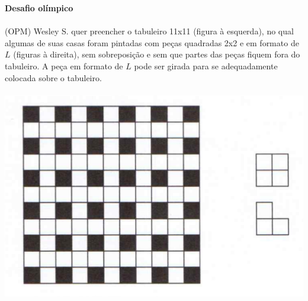 \documentclass[a4paper,14pt]{article}
\begin{document}
\begin{multicols}{2}
\begin{enumerate}
    	$~$ \\ $~$ \\ $~$ \\ $~$ \\ $~$ \\ $~$ \\ $~$ \\ $~$ \\ $~$ \\ $~$ \\ $~$ \\ $~$ \\ $~$ \\ $~$ \\ $~$ \\ $~$ \\ $~$ \\ $~$ \\ $~$ \\ $~$ \\ $~$ \\ $~$ \\ $~$ \\ $~$ \\ $~$ \\ $~$ \\ $~$ \\ $~$ \\ $~$ \\ $~$ \\ $~$ \\ $~$ \\ $~$ \\ $~$ \\ $~$ \\ $~$ \\ $~$ \\
    	\end{enumerate}
    \end{multicols}
	\textbf{Desafio olímpico} \\\\
	(OPM) Wesley S. quer preencher o tabuleiro 11x11 (figura à esquerda), no qual algumas de suas casas foram pintadas com peças quadradas 2x2 e em formato de $L$ (figuras à direita), sem sobreposição e sem que partes das peças fiquem fora do tabuleiro. A peça em formato de $L$ pode ser girada para se adequadamente colocada sobre o tabuleiro. \\\\
	\includegraphics[width=1\linewidth]{imagens_8FMA121/imagem1}
	
\end{document}
